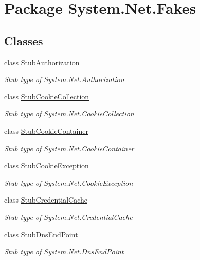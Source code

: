 \hypertarget{namespace_system_1_1_net_1_1_fakes}{\section{Package System.\-Net.\-Fakes}
\label{namespace_system_1_1_net_1_1_fakes}
}
\subsection*{Classes}
\begin{DoxyCompactItemize}
\item 
class \hyperlink{class_system_1_1_net_1_1_fakes_1_1_stub_authorization}{Stub\-Authorization}
\begin{DoxyCompactList}\small\item\em Stub type of System.\-Net.\-Authorization\end{DoxyCompactList}\item 
class \hyperlink{class_system_1_1_net_1_1_fakes_1_1_stub_cookie_collection}{Stub\-Cookie\-Collection}
\begin{DoxyCompactList}\small\item\em Stub type of System.\-Net.\-Cookie\-Collection\end{DoxyCompactList}\item 
class \hyperlink{class_system_1_1_net_1_1_fakes_1_1_stub_cookie_container}{Stub\-Cookie\-Container}
\begin{DoxyCompactList}\small\item\em Stub type of System.\-Net.\-Cookie\-Container\end{DoxyCompactList}\item 
class \hyperlink{class_system_1_1_net_1_1_fakes_1_1_stub_cookie_exception}{Stub\-Cookie\-Exception}
\begin{DoxyCompactList}\small\item\em Stub type of System.\-Net.\-Cookie\-Exception\end{DoxyCompactList}\item 
class \hyperlink{class_system_1_1_net_1_1_fakes_1_1_stub_credential_cache}{Stub\-Credential\-Cache}
\begin{DoxyCompactList}\small\item\em Stub type of System.\-Net.\-Credential\-Cache\end{DoxyCompactList}\item 
class \hyperlink{class_system_1_1_net_1_1_fakes_1_1_stub_dns_end_point}{Stub\-Dns\-End\-Point}
\begin{DoxyCompactList}\small\item\em Stub type of System.\-Net.\-Dns\-End\-Point\end{DoxyCompactList}\item 

\end{DoxyCompactItemize}
